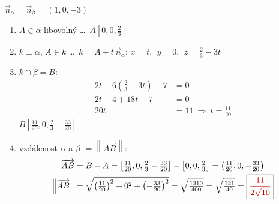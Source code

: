 \documentclass[11pt,a4paper]{article}
\newcommand{\vysl}[1]{\boxed{\color{red!75!black}#1}}
\newcommand{\pozn}[1]{{\color{red!75!black}#1}}
\newcommand{\vv}[1]{\overrightarrow{#1}}
\newcommand{\norm}[1]{\left\|#1\right\|}
\begin{document}
$\vec n_\alpha=\vec n_\beta=(1,0,-3)$
\begin{enumerate}[label=\arabic*), nosep]
\item $A\in\alpha$ libovolný \ldots\ $A\left[0,0,\frac23\right]$
\item $k\perp\alpha$, $A\in k$ \ldots\ $k=A+t\,\vec n_\alpha$: \quad $x=t,\ \ y=0,\ \ z=\frac23-3t$
\item $k\cap\beta=B$:
\begin{align*}
2t-6\left(\tfrac23-3t\right)-7 &= 0\\
2t-4+18t-7 &= 0\\
20t &= 11 \ \Rightarrow\ t=\tfrac{11}{20}
\end{align*}
$B\left[\frac{11}{20},0,\frac23-\frac{33}{20}\right]$
\item \pozn{vzdálenost $\alpha$ a $\beta$} $=\norm{\vv{AB}}$:
\begin{align*}
\vv{AB} &= B-A = \left[\tfrac{11}{20},0,\tfrac23-\tfrac{33}{20}\right]-\left[0,0,\tfrac23\right] = \left(\tfrac{11}{20},0,-\tfrac{33}{20}\right)\\
\norm{\vv{AB}} &= \sqrt{\left(\tfrac{11}{20}\right)^2+0^2+\left(-\tfrac{33}{20}\right)^2} = \sqrt{\tfrac{1210}{400}} = \sqrt{\tfrac{121}{40}} = \vysl{\frac{11}{2\sqrt{10}}}
\end{align*}
\end{enumerate}
\end{document}

